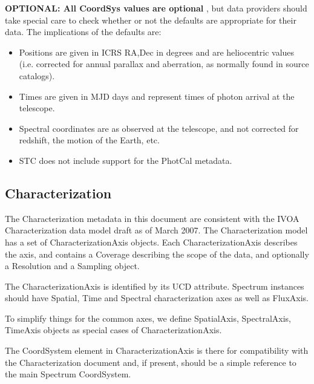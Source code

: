 \documentclass[11pt]{article}
\newcommand{\new}{\color{red}}
\begin{document}
 
{\bf OPTIONAL: All CoordSys values are optional } , but data providers
should take special care to check whether or not the defaults are appropriate for
their data. The implications of the defaults are:
\begin{itemize}
\item Positions are given in ICRS RA,Dec in degrees and are 
heliocentric values (i.e. corrected for annual parallax and aberration,
as normally found in source catalogs).
\item Times are given in MJD days and represent times of photon arrival
at the telescope.
\item Spectral coordinates are as observed at the telescope, and
not corrected for redshift, the motion of the Earth, etc.

\item {\new STC does not include support for the PhotCal metadata}.
\end{itemize}

 
\clearpage
 

\subsection{Characterization}

The Characterization metadata in this document are consistent with
the IVOA Characterization
data model draft as of March 2007. The Characterization model has
a set of CharacterizationAxis objects.  Each CharacterizationAxis
describes
the axis, and contains a Coverage describing the scope of the data, and optionally
a Resolution and a Sampling object. 

The CharacterizationAxis is identified by its UCD attribute.
Spectrum instances should have Spatial, Time and Spectral characterization axes
as well as FluxAxis.


To simplify things for the common axes, we define SpatialAxis, SpectralAxis,
TimeAxis objects as special cases of CharacterizationAxis.

The CoordSystem element in CharacterizationAxis is there for
compatibility with the Characterization document and, if present, should be a simple
reference to the main Spectrum CoordSystem.
\end{document}
